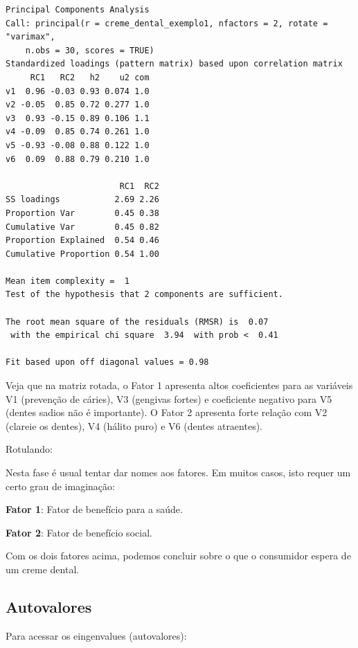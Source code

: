 \documentclass[12pt,brazil,oneside]{book}
\newenvironment{Shaded}{\begin{snugshade}}{\end{snugshade}}
\newcommand{\NormalTok}[1]{#1}
\newcommand{\OperatorTok}[1]{\textcolor[rgb]{0.81,0.36,0.00}{\textbf{#1}}}
\begin{document}
\begin{verbatim}
Principal Components Analysis
Call: principal(r = creme_dental_exemplo1, nfactors = 2, rotate = "varimax", 
    n.obs = 30, scores = TRUE)
Standardized loadings (pattern matrix) based upon correlation matrix
     RC1   RC2   h2    u2 com
v1  0.96 -0.03 0.93 0.074 1.0
v2 -0.05  0.85 0.72 0.277 1.0
v3  0.93 -0.15 0.89 0.106 1.1
v4 -0.09  0.85 0.74 0.261 1.0
v5 -0.93 -0.08 0.88 0.122 1.0
v6  0.09  0.88 0.79 0.210 1.0

                       RC1  RC2
SS loadings           2.69 2.26
Proportion Var        0.45 0.38
Cumulative Var        0.45 0.82
Proportion Explained  0.54 0.46
Cumulative Proportion 0.54 1.00

Mean item complexity =  1
Test of the hypothesis that 2 components are sufficient.

The root mean square of the residuals (RMSR) is  0.07 
 with the empirical chi square  3.94  with prob <  0.41 

Fit based upon off diagonal values = 0.98
\end{verbatim}

Veja que na matriz rotada, o Fator 1 apresenta altos coeficientes para as variáveis V1 (prevenção de cáries), V3 (gengivas fortes) e coeficiente negativo para V5 (dentes sadios não é importante). O Fator 2 apresenta forte relação com V2 (clareie os dentes), V4 (hálito puro) e V6 (dentes atraentes).

Rotulando:

Nesta fase é usual tentar dar nomes aos fatores. Em muitos casos, isto requer um certo grau de imaginação:

\textbf{Fator 1}: Fator de benefício para a saúde.

\textbf{Fator 2}: Fator de benefício social.

Com os dois fatores acima, podemos concluir sobre o que o consumidor espera de um creme dental.

\hypertarget{autovalores-1}{%
\subsection{Autovalores}\label{autovalores-1}}

Para acessar os eingenvalues (autovalores):

\begin{Shaded}
\end{Shaded}
\end{document}

